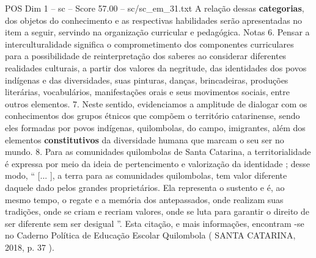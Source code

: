 \begin{textsample}{POS Dim 1 – sc – Score 57.00 – sc/sc\_em\_31.txt}
A relação dessas \textbf{categorias}, dos objetos do conhecimento e as respectivas habilidades serão apresentadas no item a seguir, servindo na organização curricular e pedagógica.
Notas 6.
Pensar a interculturalidade significa o comprometimento dos componentes curriculares para a possibilidade de reinterpretação dos saberes ao considerar diferentes realidades culturais, a partir dos valores da negritude, das identidades dos povos indígenas e das diversidades, suas pinturas, danças, brincadeiras, produções literárias, vocabulários, manifestações orais e seus movimentos sociais, entre outros elementos. 7.
Neste sentido, evidenciamos a amplitude de dialogar com os conhecimentos dos grupos étnicos que compõem o território catarinense, sendo eles formadas por povos indígenas, quilombolas, do campo, imigrantes, além dos elementos \textbf{constitutivos} da diversidade humana que marcam o seu ser no mundo. 8.
Para as comunidades quilombolas de Santa Catarina, a territorialidade é expressa por meio da ideia de pertencimento e valorização da identidade ; desse modo, “ [... ], a terra para as comunidades quilombolas, tem valor diferente daquele dado pelos grandes proprietários.
Ela representa o sustento e é, ao mesmo tempo, o regate e a memória dos antepassados, onde realizam suas tradições, onde se criam e recriam valores, onde se luta para garantir o direito de ser diferente sem ser desigual ”.
Esta citação, e mais informações, encontram -se no Caderno Política de Educação Escolar Quilombola ( SANTA CATARINA, 2018, p. 37 ).

\end{textsample}
